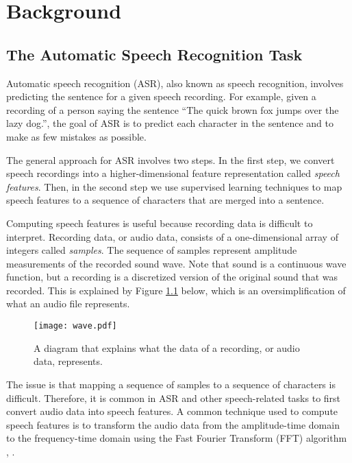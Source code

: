 \graphicspath{{background/fig/}}

\chapter{Background}
\label{chap:background}

\section{The Automatic Speech Recognition Task}\label{sec:background}
Automatic speech recognition (ASR), also known as speech recognition, 
involves predicting the sentence for a given speech recording.
For example, given a recording of a person saying the sentence ``The quick brown fox jumps over the lazy dog.'',
the goal of ASR is to predict each character in the sentence and to make as few mistakes as possible.

The general approach for ASR involves two steps.
In the first step, we convert speech recordings into a higher-dimensional feature representation called \emph{speech features}.
Then, in the second step we use supervised learning techniques to map speech features 
to a sequence of characters that are merged into a sentence.

Computing speech features is useful because recording data is difficult to interpret. 
Recording data, or audio data, consists of a one-dimensional array of integers called \emph{samples}.
The sequence of samples represent amplitude measurements of the recorded sound wave. 
Note that sound is a continuous wave function, but a recording is a discretized version of the original sound that was recorded.
This is explained by Figure \ref{fig:wave} below, which is an oversimplification of what an audio file represents.

\begin{figure}[h!]
    \centering
    \captionsetup{justification=centering}
    \texttt{[image: wave.pdf]}
    \caption{A diagram that explains what the data of a recording, or audio data, represents.}
    \label{fig:wave}
\end{figure}

The issue is that mapping a sequence of samples to a sequence of characters is difficult. 
Therefore, it is common in ASR and other speech-related tasks to first convert audio data into speech features.
A common technique used to compute speech features is to transform the audio data from the amplitude-time domain 
to the frequency-time domain using the Fast Fourier Transform (FFT) algorithm \cite{cochran1967fast}, \cite{cooley1969fast}.

